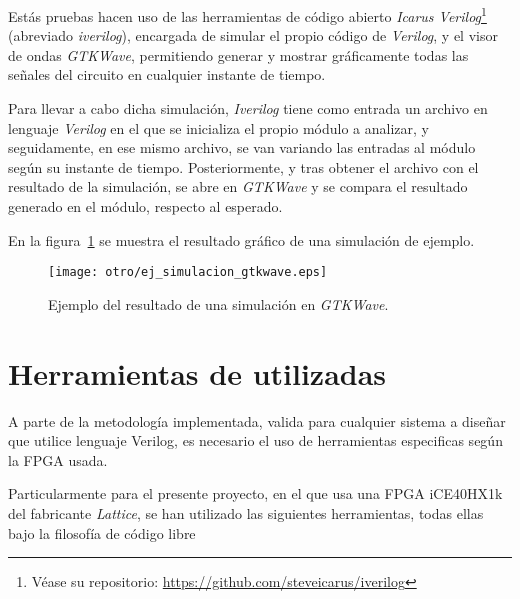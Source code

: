 Estás pruebas hacen uso de las herramientas de código abierto \emph{Icarus Verilog}\footnote{Véase su repositorio: \url{https://github.com/steveicarus/iverilog}} (abreviado \emph{iverilog}), encargada de simular el propio código de \emph{Verilog}, y el visor de ondas \emph{GTKWave}\cite{gtkwave2019}, permitiendo generar y mostrar gráficamente todas las señales del circuito en cualquier instante de tiempo.

Para llevar a cabo dicha simulación, \emph{Iverilog} tiene como entrada un archivo en lenguaje \emph{Verilog} en el que se inicializa el propio módulo a analizar, y seguidamente, en ese mismo archivo, se van variando las entradas al módulo según su instante de tiempo. Posteriormente, y tras obtener el archivo con el resultado de la simulación, se abre en \emph{GTKWave} y se compara el resultado generado en el módulo, respecto al esperado.

En la figura~\ref{fig:ej-gtkwave} se muestra el resultado gráfico de una simulación de ejemplo.

\begin{figure}[htb]
    \centering
    \texttt{[image: otro/ej\_simulacion\_gtkwave.eps]}
    \caption{Ejemplo del resultado de una simulación en \emph{GTKWave}.}
    \label{fig:ej-gtkwave}
\end{figure}



\section{Herramientas de utilizadas}
A parte de la metodología implementada, valida para cualquier sistema a diseñar que utilice lenguaje Verilog, es necesario el uso de herramientas especificas según la FPGA usada.

Particularmente para el presente proyecto, en el que usa una FPGA iCE40HX1k del fabricante \emph{Lattice}, se han utilizado las siguientes herramientas, todas ellas bajo la filosofía de código libre

